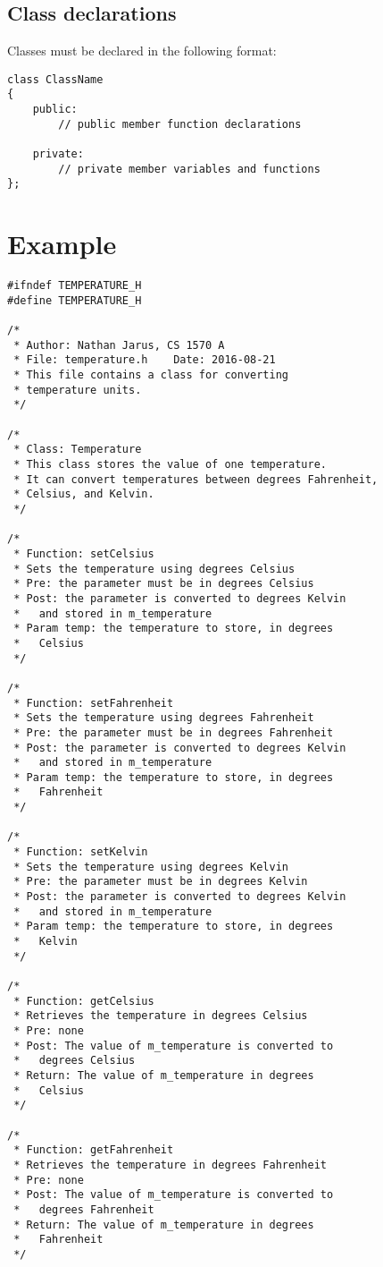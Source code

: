 \documentclass{article}
\begin{document}
\subsection{Class declarations}
Classes must be declared in the following format:
\begin{lstlisting}
class ClassName
{
	public:
		// public member function declarations

	private:
		// private member variables and functions
};
\end{lstlisting}

\section*{Example}
\begin{lstlisting}[caption=temperature.h]
#ifndef TEMPERATURE_H
#define TEMPERATURE_H

/*
 * Author: Nathan Jarus, CS 1570 A
 * File: temperature.h    Date: 2016-08-21
 * This file contains a class for converting
 * temperature units.
 */

/*
 * Class: Temperature
 * This class stores the value of one temperature.
 * It can convert temperatures between degrees Fahrenheit,
 * Celsius, and Kelvin.
 */

/*
 * Function: setCelsius
 * Sets the temperature using degrees Celsius
 * Pre: the parameter must be in degrees Celsius
 * Post: the parameter is converted to degrees Kelvin
 *   and stored in m_temperature
 * Param temp: the temperature to store, in degrees
 *   Celsius
 */

/*
 * Function: setFahrenheit
 * Sets the temperature using degrees Fahrenheit
 * Pre: the parameter must be in degrees Fahrenheit
 * Post: the parameter is converted to degrees Kelvin
 *   and stored in m_temperature
 * Param temp: the temperature to store, in degrees
 *   Fahrenheit
 */

/*
 * Function: setKelvin
 * Sets the temperature using degrees Kelvin
 * Pre: the parameter must be in degrees Kelvin
 * Post: the parameter is converted to degrees Kelvin
 *   and stored in m_temperature
 * Param temp: the temperature to store, in degrees
 *   Kelvin
 */

/*
 * Function: getCelsius
 * Retrieves the temperature in degrees Celsius
 * Pre: none
 * Post: The value of m_temperature is converted to
 *   degrees Celsius
 * Return: The value of m_temperature in degrees
 *   Celsius
 */

/*
 * Function: getFahrenheit
 * Retrieves the temperature in degrees Fahrenheit
 * Pre: none
 * Post: The value of m_temperature is converted to
 *   degrees Fahrenheit
 * Return: The value of m_temperature in degrees
 *   Fahrenheit
 */


\end{lstlisting}
\end{document}
